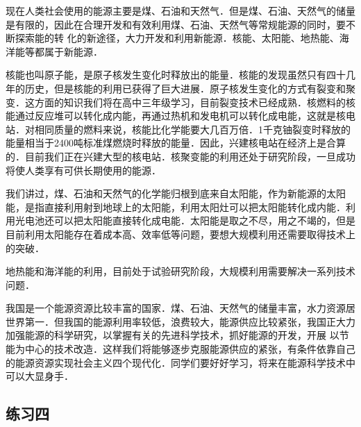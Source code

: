 现在人类社会使用的能源主要是煤、石油和天然气．但是煤、石油、天然气的储量是有限的，因此在合理开发和有效利用煤、石油、天然气等常规能源的同时，要不断探索能的转
化的新途径，大力开发和利用新能源．核能、太阳能、地热能、海洋能等都属于新能源．

核能也叫原子能，是原子核发生变化时释放出的能量．核能的发现虽然只有四十几年的历史，但是核能的利用已获得了巨大进展．原子核发生变化的方式有裂变和聚变．这方面的知识我们将在高中三年级学习，目前裂变技术已经成熟．核燃料的核能通过反应堆可以转化成内能，再通过热机和发电机可以转化成电能，这就是核电站．对相同质量的燃料来说，核能比化学能要大几百万倍．1千克铀裂变时释放的能量相当于2400吨标准煤燃烧时释放的能量．因此，兴建核电站在经济上是合算的．目前我们正在兴建大型的核电站．核聚变能的利用还处于研究阶段，一旦成功将使人类享有可供长期使用的能源．

我们讲过，煤、石油和天然气的化学能归根到底来自太阳能，作为新能源的太阳能，是指直接利用射到地球上的太阳能，利用太阳灶可以把太阳能转化成内能．利用光电池还可以把太阳能直接转化成电能．太阳能是取之不尽，用之不竭的，但是目前利用太阳能存在着成本高、效率低等问题，要想大规模利用还需要取得技术上的突破．

地热能和海洋能的利用，目前处于试验研究阶段，大规模利用需要解决一系列技术问题．

我国是一个能源资源比较丰富的国家．煤、石油、天然气的储量丰富，水力资源居世界第一．但我国的能源利用率较低，浪费较大，能源供应比较紧张，我国正大力加强能源的科学研究，以掌握有关的先进科学技术，抓好能源的开发，开展
以节能为中心的技术改造．这样我们将能够逐步克服能源供应的紧张，有条件依靠自己的能源资源实现社会主义四个现代化．同学们要好好学习，将来在能源科学技术中可以大显身手．

\subsection*{练习四}

